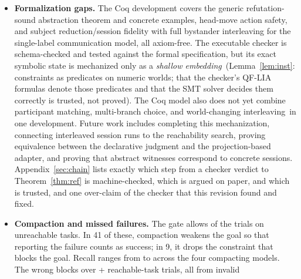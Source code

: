 \documentclass{article}
\theoremstyle{plain}
\theoremstyle{definition}
\def \bgc {}
\def \egc {}
\newcommand{\bnew}{\begingroup\color{revblue}}
\newcommand{\bnew}{\begingroup}
\newcommand{\enew}{\endgroup}
\newcommand{\new}[1]{{\bnew #1\enew}}
\begin{document}
\begin{itemize}
\item \textbf{Formalization gaps.} The Coq development covers the generic
refutation-sound abstraction theorem and concrete examples, head-move action
safety, and subject reduction/session fidelity with full bystander interleaving
for the single-label communication model, all axiom-free. The executable checker
is schema-checked and tested against the formal specification, but its exact
symbolic state is mechanized only as a \emph{shallow embedding}\bgc\ (Lemma~\ref{lem:inst}:
constraints as predicates on numeric worlds; that the checker's QF-LIA formulas
denote those predicates and that the SMT solver decides them correctly is
trusted, not proved)\egc. The Coq model also does not yet
combine \bgc participant matching, multi-branch choice, and
world-changing interleaving\egc\ in one development. Future work includes completing
this mechanization, connecting interleaved session runs to the reachability
search, proving equivalence between the declarative judgment and the
projection-based adapter, and proving that abstract witnesses correspond to
concrete sessions. \new{Appendix~\ref{sec:chain} lists exactly which step from
a checker verdict to Theorem~\ref{thm:ref} is machine-checked, which is argued
on paper, and which is trusted, and one over-claim of the checker that
this revision found and fixed.}
\item \textbf{Compaction and missed failures.} The gate allows \ValueFN{} of
the \ValueFailed{} trials on unreachable tasks. In 41 of these, compaction weakens the
goal so that reporting the failure counts as success; in 9, it drops the
constraint that blocks the goal. Recall ranges from \ValueCodexRecall{} to
\ValueOpusRecall{} across the four compacting models. The \ValueFP{} wrong
blocks over \ValueFP{}+\ValueTN{} reachable-task trials, all from invalid

\end{itemize}
\end{document}
